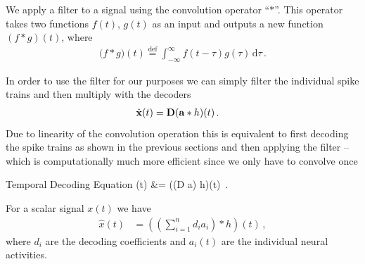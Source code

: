 \documentclass[10pt,letterpaper,oneside]{article}
\begin{document}
We apply a filter to a signal using the convolution operator \enquote{$\ast$}. This operator takes two functions $f(t)$, $g(t)$ as an input and outputs a new function $(f \ast g)(t)$, where
\begin{align*}
	\big( f \ast g \big)(t) \overset{\text{def}}= \int_{-\infty}^{\infty} f(t - \tau) g(\tau) \,\mathrm{d}\tau\,.
\end{align*}


In order to use the filter for our purposes we can simply filter the individual spike trains and then multiply with the decoders 
\begin{align*}
	\hat{{\mathbf{x}}}(t) &= {\mathbf{D}} ({\mathbf{a}} \ast h)(t) \,.
\end{align*}
Due to linearity of the convolution operation this is equivalent to first decoding the spike trains as shown in the previous sections and then applying the filter -- which is computationally much more efficient since we only have to convolve once
\begin{ImportantEqn}{Temporal Decoding Equation}
	(t) &= \big((\mat D \vec a) \ast h\big)(t) \,.
	\label{eqn:temporal_decoding_equation}
\end{ImportantEqn}
For a scalar signal $x(t)$ we have
\begin{align*}
	\hat{x}(t) &= \left( \left( \sum_{i = 1}^n d_i a_i \right) \ast h\right)(t) \,,
\end{align*}
where $d_i$ are the decoding coefficients and $a_i(t)$ are the individual neural activities.
\end{document}
